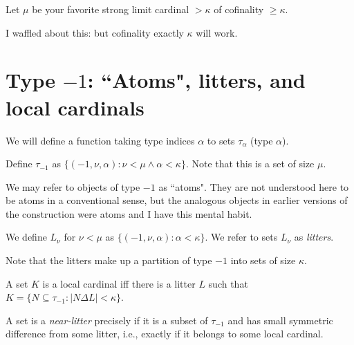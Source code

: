 \begin{definition}
\label {def:mu}  
Let $\mu$ be your favorite strong limit cardinal $>\kappa$ of cofinality $\geq \kappa$.
\end{definition}

I waffled about this:  but cofinality exactly $\kappa$ will work.

\section{Type $-1$:  ``Atoms", litters, and local cardinals}

We will define a function taking type indices $\alpha$ to sets $\tau_\alpha$ (type $\alpha$).

\begin{definition}
\label {def:type-minus-one}    
Define $\tau_{-1}$ as  $\{(-1,\nu,\alpha):\nu<\mu \wedge \alpha<\kappa\}$.  Note that this is a set of size $\mu$.
\end{definition}

We may refer to objects of type $-1$ as ``atoms".  They are not understood here to be atoms in a conventional sense, but the analogous objects in earlier versions of the construction were atoms and I have this mental habit.

\begin{definition}
\label {def:litter}    
We define $L_\nu$ for $\nu<\mu$ as $\{(-1,\nu,\alpha):\alpha<\kappa\}$.  We refer to sets $L_\nu$ as {\em litters\/}.

Note that the litters make up a partition of type $-1$ into sets of size $\kappa$.
\end{definition}

\begin{definition}
\label {def-local-cardinal}  
A set $K$ is a local cardinal iff there is a litter $L$ such that $K=\{N \subseteq \tau_{-1}:|N \Delta L|<\kappa\}$.
\end{definition}

\begin{definition}
\label {def:near-litter}  
A set is a {\em near-litter} precisely if it is a subset of $\tau_{-1}$ and has small symmetric difference from some litter, i.e., exactly if it belongs to some local cardinal.
\end{definition}

